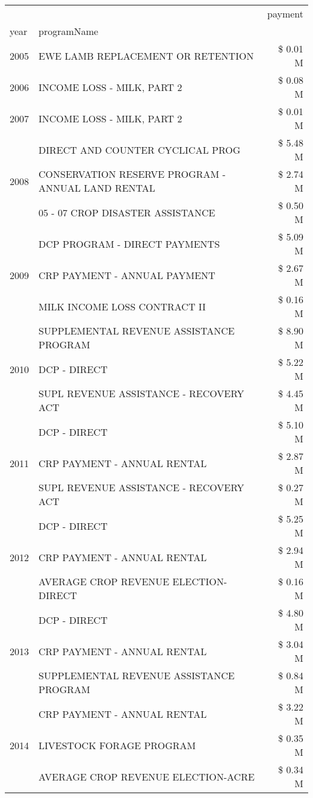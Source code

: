 \begin{tabular}{llr}
\toprule
 &  & payment \\
year & programName &  \\
\midrule
2005 & EWE LAMB REPLACEMENT OR RETENTION & \$ 0.01 M \\
\cline{1-3}
2006 & INCOME LOSS - MILK, PART 2 & \$ 0.08 M \\
\cline{1-3}
2007 & INCOME LOSS - MILK, PART 2 & \$ 0.01 M \\
\cline{1-3}
\multirow[t]{3}{*}{2008} & DIRECT AND COUNTER CYCLICAL PROG & \$ 5.48 M \\
 & CONSERVATION RESERVE PROGRAM - ANNUAL LAND RENTAL & \$ 2.74 M \\
 & 05 - 07 CROP DISASTER ASSISTANCE & \$ 0.50 M \\
\cline{1-3}
\multirow[t]{3}{*}{2009} & DCP PROGRAM - DIRECT PAYMENTS & \$ 5.09 M \\
 & CRP PAYMENT - ANNUAL PAYMENT & \$ 2.67 M \\
 & MILK INCOME LOSS CONTRACT II & \$ 0.16 M \\
\cline{1-3}
\multirow[t]{3}{*}{2010} & SUPPLEMENTAL REVENUE ASSISTANCE PROGRAM & \$ 8.90 M \\
 & DCP - DIRECT & \$ 5.22 M \\
 & SUPL REVENUE ASSISTANCE - RECOVERY ACT & \$ 4.45 M \\
\cline{1-3}
\multirow[t]{3}{*}{2011} & DCP - DIRECT & \$ 5.10 M \\
 & CRP PAYMENT - ANNUAL RENTAL & \$ 2.87 M \\
 & SUPL REVENUE ASSISTANCE - RECOVERY ACT & \$ 0.27 M \\
\cline{1-3}
\multirow[t]{3}{*}{2012} & DCP - DIRECT & \$ 5.25 M \\
 & CRP PAYMENT - ANNUAL RENTAL & \$ 2.94 M \\
 & AVERAGE CROP REVENUE ELECTION-DIRECT & \$ 0.16 M \\
\cline{1-3}
\multirow[t]{3}{*}{2013} & DCP - DIRECT & \$ 4.80 M \\
 & CRP PAYMENT - ANNUAL RENTAL & \$ 3.04 M \\
 & SUPPLEMENTAL REVENUE ASSISTANCE PROGRAM & \$ 0.84 M \\
\cline{1-3}
\multirow[t]{3}{*}{2014} & CRP PAYMENT - ANNUAL RENTAL & \$ 3.22 M \\
 & LIVESTOCK FORAGE PROGRAM & \$ 0.35 M \\
 & AVERAGE CROP REVENUE ELECTION-ACRE & \$ 0.34 M \\
\cline{1-3}

\end{tabular}
